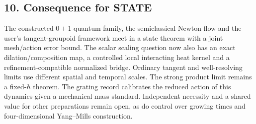 \documentclass[11pt,a4paper]{article}
\begin{document}
\subsection{10. Consequence for STATE}\label{consequence-for-state}

\protect{}\label{9-consequence-for-state}{}

The constructed \(0+1\) quantum family, the semiclassical Newton flow
and the user's tangent-groupoid framework meet in a state theorem with a
joint mesh/action error bound. The scalar scaling question now also has
an exact dilation/composition map, a controlled local interacting heat
kernel and a refinement-compatible normalized bridge. Ordinary tangent
and well-resolving limits use different spatial and temporal scales. The
strong product limit remains a fixed-\(\hbar\) theorem. The grating
record calibrates the reduced action of this dynamics given a mechanical
mass standard. Independent necessity and a shared value for other
preparations remain open, as do control over growing times and
four-dimensional Yang--Mills construction.
\end{document}
